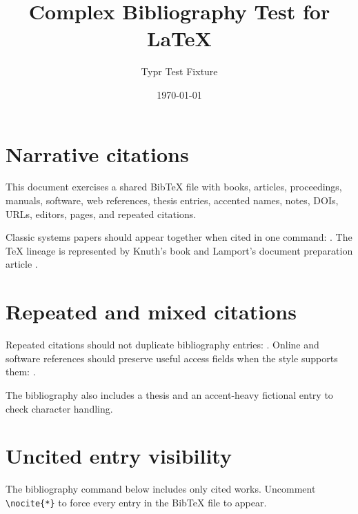 \documentclass[11pt]{article}
\title{Complex Bibliography Test for LaTeX}
\author{Typr Test Fixture}
\date{\today}
\begin{document}
\maketitle

\section{Narrative citations}
This document exercises a shared BibTeX file with books, articles, proceedings,
manuals, software, web references, thesis entries, accented names, notes, DOIs,
URLs, editors, pages, and repeated citations.

Classic systems papers should appear together when cited in one command:
\cite{turing1936computable,church1936unsolvable,mccarthy1960recursive}.
The TeX lineage is represented by Knuth's book \cite{knuth1984texbook} and
Lamport's document preparation article \cite{lamport1986document}.

\section{Repeated and mixed citations}
Repeated citations should not duplicate bibliography entries:
\cite{knuth1984texbook,lamport1986document}. Online and software references
should preserve useful access fields when the style supports them:
\cite{typst2026docs,latexproject2026,svgedit2026}.

The bibliography also includes a thesis \cite{shannon1940symbolic} and an
accent-heavy fictional entry \cite{garcia2024accents} to check character
handling.

\section{Uncited entry visibility}
The bibliography command below includes only cited works. Uncomment
\verb|\nocite{*}| to force every entry in the BibTeX file to appear.



\end{document}
